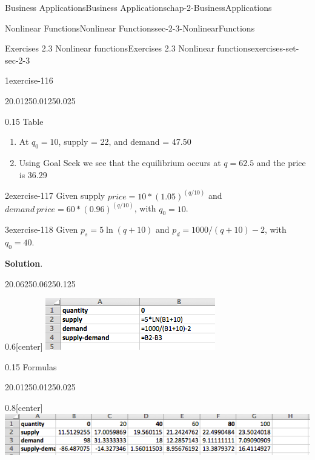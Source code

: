 \documentclass[oneside,10pt,]{book}
\numberwithin{equation}{section}
\begin{document}
\begin{chapterptx}{Business Applications}{}{Business Applications}{}{}{chap-2-BusinessApplications}
\begin{sectionptx}{Nonlinear Functions}{}{Nonlinear Functions}{}{}{sec-2-3-NonlinearFunctions}
\begin{exercises-subsection-numberless}{Exercises 2.3 Nonlinear functions}{}{Exercises 2.3 Nonlinear functions}{}{}{exercises-set-sec-2-3}
\begin{exercisegroup}
\begin{divisionexerciseeg}{1}{}{}{exercise-116}
\begin{sidebyside}{2}{0.0125}{0.0125}{0.025}
\begin{sbspanel}{0.15}
\hypertarget{p-806}{}%
Table%
\end{sbspanel}%
\end{sidebyside}%
\leavevmode%
\begin{enumerate}[label=(\alph*)]
\item\hypertarget{li-224}{}\hypertarget{p-807}{}%
At \(q_0=10\), supply = \textdollar{}22, and demand = \textdollar{}47.50%
\item\hypertarget{li-225}{}\hypertarget{p-808}{}%
Using Goal Seek we see that the equilibrium occurs at \(q = 62.5\) and the price is \textdollar{}36.29%
\end{enumerate}
\end{divisionexerciseeg}%
\begin{divisionexerciseeg}{2}{}{}{exercise-117}%
\hypertarget{p-809}{}%
Given supply \(price=10*(1.05)^{(q/10)}\) and \(demand\ price=60*(0.96)^{(q/10)}\), with \(q_0=10\).%
\end{divisionexerciseeg}%
\begin{divisionexerciseeg}{3}{}{}{exercise-118}%
\hypertarget{p-810}{}%
Given \(p_s=5 \ln(q+10)\) and \(p_d=1000/(q+10)-2\), with \(q_0=40\).%
\par\smallskip%
\noindent\textbf{Solution}.\hypertarget{solution-57}{}\quad%
\leavevmode%
\begin{sidebyside}{2}{0.0625}{0.0625}{0.125}%
\begin{sbspanel}{0.6}[center]%
\includegraphics[width=1\linewidth]{images/sec2-3-sol3a.png}
\end{sbspanel}%
\begin{sbspanel}{0.15}%
\hypertarget{p-811}{}%
Formulas%
\end{sbspanel}%
\end{sidebyside}%
\begin{sidebyside}{2}{0.0125}{0.0125}{0.025}%
\begin{sbspanel}{0.8}[center]%
\includegraphics[width=1\linewidth]{images/sec2-3-sol3b.png}

\end{sbspanel}
\end{sidebyside}
\end{divisionexerciseeg}
\end{exercisegroup}
\end{exercises-subsection-numberless}
\end{sectionptx}
\end{chapterptx}
\end{document}
